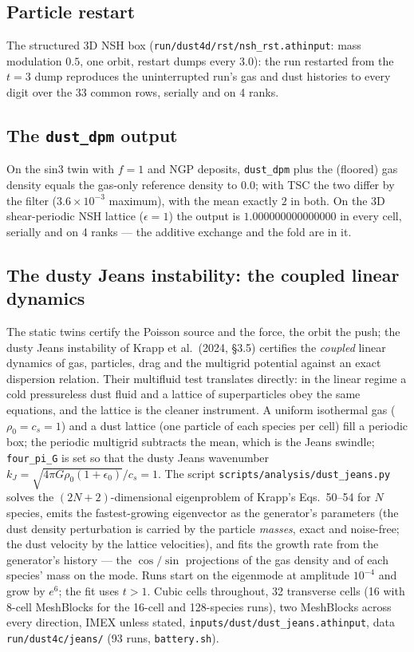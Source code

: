 \documentclass[11pt]{article}
\newcommand{\code}[1]{\texttt{#1}}
\newcommand{\file}[1]{\texttt{#1}}
\begin{document}
\subsection{Particle restart}

The structured 3D NSH box (\file{run/dust4d/rst/nsh\_rst.athinput}: mass modulation
$0.5$, one orbit, restart dumps every $3.0$): the run restarted from the $t = 3$ dump
reproduces the uninterrupted run's gas and dust histories to every digit over the 33
common rows, serially and on 4 ranks.

\subsection{The \code{dust\_dpm} output}

On the sin3 twin with $f = 1$ and NGP deposits, \code{dust\_dpm} plus the (floored) gas
density equals the gas-only reference density to $0.0$; with TSC the two differ by the
filter ($3.6\times10^{-3}$ maximum), with the mean exactly $2$ in both. On the 3D
shear-periodic NSH lattice ($\epsilon = 1$) the output is $1.000000000000000$ in every
cell, serially and on 4 ranks --- the additive exchange and the fold are in it.

\subsection{The dusty Jeans instability: the coupled linear dynamics}
\label{sec:jeans}

The static twins certify the Poisson source and the force, the orbit the push; the
dusty Jeans instability of Krapp et al.\ (2024, \S3.5) certifies the \emph{coupled}
linear dynamics of gas, particles, drag and the multigrid potential against an exact
dispersion relation. Their multifluid test translates directly: in the linear regime a
cold pressureless dust fluid and a lattice of superparticles obey the same equations,
and the lattice is the cleaner instrument. A uniform isothermal gas ($\rho_0 = c_s = 1$)
and a dust lattice (one particle of each species per cell) fill a periodic box; the
periodic multigrid subtracts the mean, which is the Jeans swindle;
\code{four\_pi\_G} is set so that the dusty Jeans wavenumber
$k_J = \sqrt{4\pi G\rho_0(1+\epsilon_0)}/c_s = 1$. The script
\file{scripts/analysis/dust\_jeans.py} solves the $(2N+2)$-dimensional eigenproblem of
Krapp's Eqs.\ 50--54 for $N$ species, emits the fastest-growing eigenvector as the
generator's parameters (the dust density perturbation is carried by the particle
\emph{masses}, exact and noise-free; the dust velocity by the lattice velocities), and
fits the growth rate from the generator's history --- the $\cos/\sin$ projections of the
gas density and of each species' mass on the mode. Runs start on the eigenmode at
amplitude $10^{-4}$ and grow by $e^{6}$; the fit uses $t > 1$. Cubic cells throughout,
32 transverse cells (16 with 8-cell MeshBlocks for the 16-cell and 128-species runs),
two MeshBlocks across every direction, IMEX unless stated,
\file{inputs/dust/dust\_jeans.athinput}, data \file{run/dust4c/jeans/} (93 runs,
\file{battery.sh}).
\end{document}
